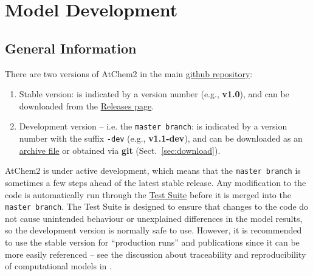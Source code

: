 %
%
%
%

\chapter{Model Development} \label{ch:development}

\section{General Information} \label{sec:general-information}

There are two versions of AtChem2 in the main
\href{https://github.com/AtChem/AtChem2}{github repository}:

\begin{enumerate}
\item Stable version: is indicated by a version number (e.g.,
  \textbf{v1.0}), and can be downloaded from the
  \href{https://github.com/AtChem/AtChem2/releases}{Releases page}.
\item Development version -- i.e. the \texttt{master\ branch}: is
  indicated by a version number with the suffix \texttt{-dev} (e.g.,
  \textbf{v1.1-dev}), and can be downloaded as an
  \href{https://github.com/AtChem/AtChem2/archive/master.zip}{archive
    file} or obtained via \textbf{git} (Sect.~\ref{sec:download}).
\end{enumerate}

AtChem2 is under active development, which means that the
\texttt{master\ branch} is sometimes a few steps ahead of the latest
stable release. Any modification to the code is automatically run
through the \hyperref[sec:test-suite]{Test Suite} before it is merged
into the \texttt{master\ branch}. The Test Suite is designed to ensure
that changes to the code do not cause unintended behaviour or
unexplained differences in the model results, so the development
version is normally safe to use. However, it is recommended to use the
stable version for ``production runs'' and publications since it can
be more easily referenced -- see the discussion about traceability and
reproducibility of computational models in \citet{sommariva_2020}.

